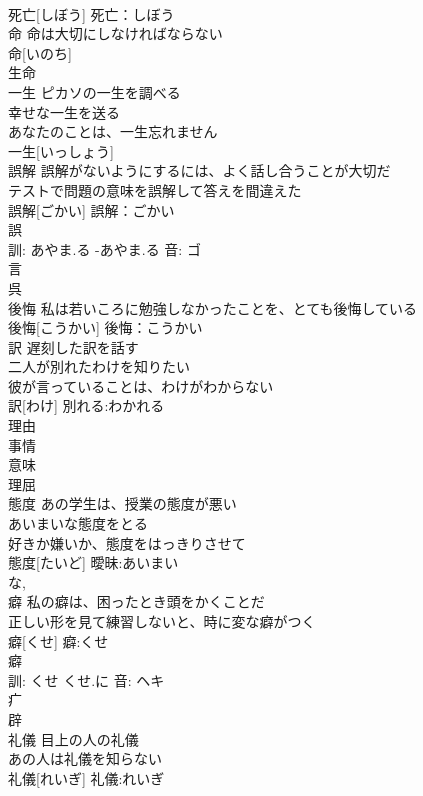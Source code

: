 \documentclass[8pt]{extreport}
\begin{document}
\begin{CJK}{UTF8}{min}
\\	死亡[しぼう]			死亡：しぼう
\\	命	命は大切にしなければならない 
\\	命[いのち]			
\\	生命 
\\	一生	ピカソの一生を調べる 
\\	幸せな一生を送る 
\\	あなたのことは、一生忘れません 
\\	一生[いっしょう]						
\\	誤解	誤解がないようにするには、よく話し合うことが大切だ 
\\	テストで問題の意味を誤解して答えを間違えた 
\\	誤解[ごかい]			誤解：ごかい
\\	誤 
\\	訓: あやま.る -あやま.る 音: ゴ 
\\	言 
\\	呉 
\\	後悔	私は若いころに勉強しなかったことを、とても後悔している 
\\	後悔[こうかい]			後悔：こうかい
\\	訳	遅刻した訳を話す 
\\	二人が別れたわけを知りたい 
\\	彼が言っていることは、わけがわからない 
\\	訳[わけ]			別れる:わかれる
\\	理由 
\\	事情 
\\	意味 
\\	理屈 
\\	態度	あの学生は、授業の態度が悪い 
\\	あいまいな態度をとる 
\\	好きか嫌いか、態度をはっきりさせて 
\\	態度[たいど]			曖昧:あいまい
\\	な, 
\\	癖	私の癖は、困ったとき頭をかくことだ 
\\	正しい形を見て練習しないと、時に変な癖がつく 
\\	癖[くせ]			癖:くせ
\\	癖 
\\	訓: くせ くせ.に 音: ヘキ 
\\	疒 
\\	辟 
\\	礼儀	目上の人の礼儀 
\\	あの人は礼儀を知らない 
\\	礼儀[れいぎ]			礼儀:れいぎ

\end{CJK}
\end{document}
